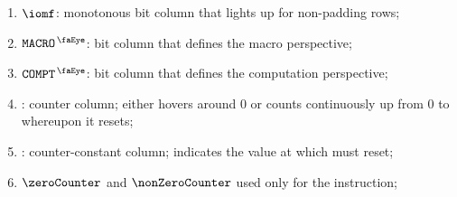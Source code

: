 \begin{enumerate}
    \item $\iomf$:
	monotonous bit column that lights up for non-padding rows;
    \item $\isRlpUtilsMacro$:
	bit column that defines the macro perspective;
	\item $\isRlpUtilsCompt$:
	bit column that defines the computation perspective;
    \item \ct{}:
	counter column; 
	either hovers around $0$ or counts continuously up from $0$ to \maxCt{} whereupon it resets;
    \item \maxCt:
	counter-constant column;
	indicates the value at which \ct{} must reset;
	\item $\zeroCounter$ and $\nonZeroCounter$ used only for the  instruction;
\end{enumerate}
